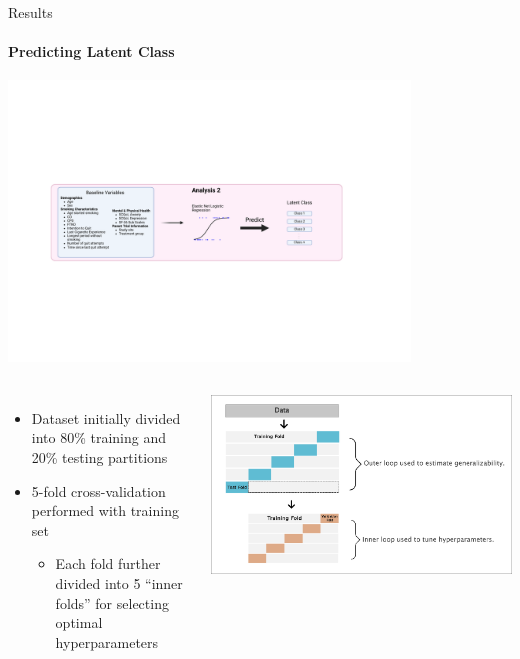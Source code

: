 \documentclass[aspectratio=169]{beamer}
\begin{document}
\begin{frame}{Results}
	\framesubtitle{Predicting Latent Class}
	\centering
	\includegraphics[width=0.8\textwidth]{overview2}
	\begin{columns}
		\begin{itemize}
			\small
			\item Dataset initially divided into 80\% training and 20\% testing partitions
			\item 5-fold cross-validation performed with training set
			\begin{itemize}
				\item Each fold further divided into 5 ``inner folds'' for selecting optimal hyperparameters
			\end{itemize}
		\end{itemize}
			
		\includegraphics[width=.8\columnwidth]{crossval_diagram}
	\end{columns}

\end{frame}
\end{document}
